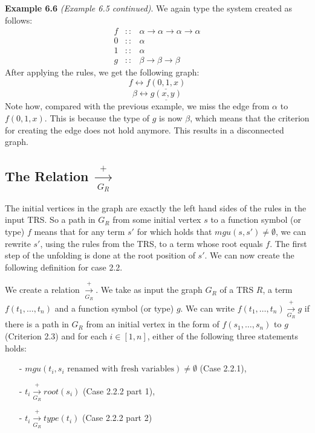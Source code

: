 \textbf{Example 6.6} \textit{(Example 6.5 continued)}. We again type the system created as follows:
\[
\begin{array}{rcl}
    f & :: & \alpha \rightarrow \alpha \rightarrow \alpha \rightarrow \alpha \\
    0 & :: & \alpha \\
    1 & :: & \alpha \\
    g & :: & \beta \rightarrow \beta \rightarrow \beta 
\end{array}
\]
After applying the rules, we get the following graph:
\[
f \longleftrightarrow \underline{f(0, 1, x)} 
\]
\[
\beta \longleftrightarrow \underline{g(x,y)}
\]
Note how, compared with the previous example, we miss the edge from $\alpha$ to $f(0, 1, x)$. This is because the type of $g$ is now $\beta$, which means that the criterion for creating the edge does not hold anymore. This results in a disconnected graph. 

\subsection*{The Relation $\xrightarrow[G_R]{+}$}
The initial vertices in the graph are exactly the left hand sides of the rules in the input TRS. So a path in $G_R$ from some initial vertex $s$ to a function symbol (or type) $f$ means that for any term $s'$ for which holds that $\textit{mgu}(s, s') \neq \emptyset$, we can rewrite $s'$, using the rules from the TRS, to a term whose root equals $f$. The first step of the unfolding is done at the root position of $s'$. We can now create the following definition for case 2.2.

\begin{definition}
\label{def:arrowrelation}
We create a relation $\xrightarrow[G_R]{+}$. We take as input the graph $G_R$ of a TRS $R$, a term $f(t_1, \dots, t_n)$ and a function symbol (or type) $g$. We can write $f(t_1, \dots, t_n) \xrightarrow[G_R]{+} g$ if there is a path in $G_R$ from an initial vertex in the form of $f(s_1, \dots, s_n)$ to $g$ (Criterion 2.3) and for each $i \in [1, n]$, either of the following three statements holds:
\begin{itemize}
    \itemsep -0.2em
    \item[-] $\textit{mgu}(t_i, s_i \text{ renamed with fresh variables}) \neq \emptyset$ (Case 2.2.1),
    \item[-] $t_i \xrightarrow[G_R]{+} \textit{root}(s_i)$ (Case 2.2.2 part 1),
    \item[-] $t_i \xrightarrow[G_R]{+} \textit{type}(t_i)$ (Case 2.2.2 part 2)
\end{itemize}
\end{definition}

